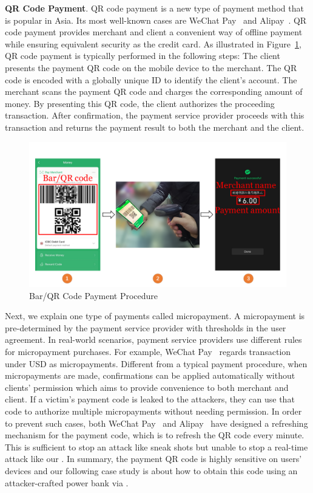 \textbf{QR Code Payment}.
QR code payment is a new type of payment method that is popular in Asia. Its most well-known cases are WeChat Pay~\cite{Wechat-pay} and Alipay~\cite{AliPay}. QR code payment provides merchant and client a convenient way of offline payment while ensuring equivalent security as the credit card.
As illustrated in Figure~\ref{fig:qr_payment_procedure}, QR code payment is typically performed in the following steps:
 The client presents the payment QR code on the mobile device to the merchant.
The QR code is encoded with a globally unique ID to identify the client's account.
 The merchant scans the payment QR code and charges the corresponding amount of money.
By presenting this QR code, the client authorizes the proceeding transaction.
 After confirmation, the payment service provider proceeds with this transaction and returns the payment result to both the merchant and the client.

\begin{figure}[t]
	\centering
	\includegraphics[width=\linewidth]{./Figs/qr_code_payment.png}
	\caption{Bar/QR Code Payment Procedure}
	\label{fig:qr_payment_procedure}
\end{figure}


Next, we explain one type of payments called micropayment. A micropayment is pre-determined by the payment
service provider with thresholds in the user agreement. In real-world scenarios, payment service providers use different rules
for micropayment purchases. For example, WeChat
Pay~\cite{Wechat-pay} regards transaction under USD  as
micropayments.  Different from a typical payment procedure, when micropayments
are made, confirmations can be applied automatically without clients'
permission which aims to provide convenience to both merchant and client.  If a
victim's payment code is leaked to the attackers, they can use that code to
authorize multiple micropayments without needing permission.  In order to prevent such
cases, both WeChat Pay~\cite{Wechat-pay} and Alipay~\cite{AliPay} have designed a refreshing mechanism for the
payment code, which is to refresh the QR code every minute. This is sufficient
to stop an attack like sneak shots but unable to stop a real-time attack like our
\tool.  In summary, the payment QR code is highly sensitive on users' devices
and our following case study is about how to obtain this code using an
attacker-crafted power bank via \tool.

